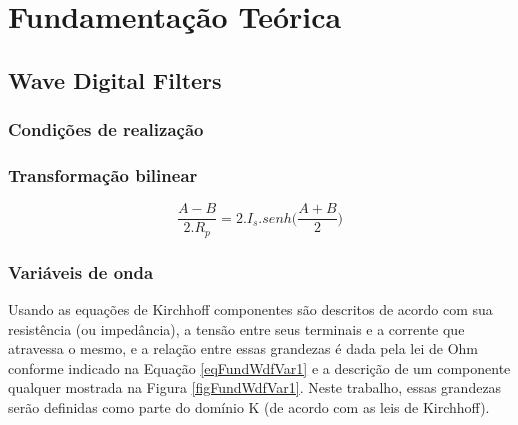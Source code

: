 







	\chapter{Fundamentação Teórica}

	\section{Wave Digital Filters}
	
	\subsection{Condições de realização}
	\label{secFundCond}
	
	
	
	\subsection{Transformação bilinear}
	
	\begin{equation}
		\frac{A-B}{2.R_p} = 2.I_s.senh\bigg(\frac{A+B}{2}\bigg)
	\end{equation}
	
	
	\subsection{Variáveis de onda}
	
	Usando as equações de Kirchhoff componentes são descritos de acordo com sua resistência (ou impedância), a tensão entre seus terminais e a corrente que atravessa o mesmo, e a relação entre essas grandezas é dada pela lei de Ohm conforme indicado na Equação \ref{eqFundWdfVar1} e a descrição de um componente qualquer mostrada na Figura \ref{figFundWdfVar1}. Neste trabalho, essas grandezas serão definidas como parte do domínio K (de acordo com as leis de Kirchhoff). 
	
